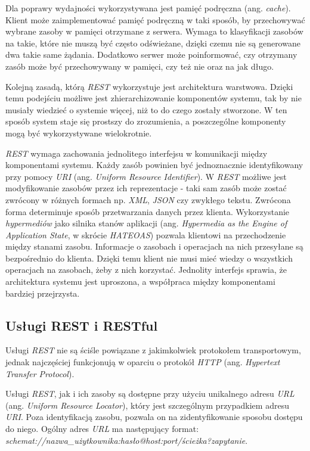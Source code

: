 Dla poprawy wydajności wykorzystywana  jest pamięć podręczna (ang. \textsl{cache}). Klient może zaimplementować pamięć podręczną w taki sposób, by przechowywać wybrane zasoby w pamięci otrzymane z serwera. Wymaga to klasyfikacji zasobów na takie, które nie muszą być często odświeżane, dzięki czemu nie są generowane dwa takie same żądania. Dodatkowo serwer może poinformować, czy otrzymany zasób może być przechowywany w pamięci, czy też nie oraz na jak długo. 

Kolejną zasadą, którą \textsl{REST} wykorzystuje jest architektura warstwowa. Dzięki temu podejściu możliwe jest zhierarchizowanie komponentów systemu, tak by nie  musiały wiedzieć o systemie więcej, niż to do czego zostały stworzone. W ten sposób system staje się prostszy do zrozumienia, a poszczególne komponenty mogą być wykorzystywane wielokrotnie.


\textsl{REST} wymaga zachowania jednolitego interfejsu w komunikacji między komponentami systemu. Każdy zasób powinien być jednoznacznie identyfikowany przy pomocy \textsl{URI} (ang. \textsl{Uniform Resource Identifier}). W \textsl{REST} możliwe jest modyfikowanie zasobów przez ich reprezentacje - taki sam zasób może zostać zwrócony w różnych formach np. \textsl{XML}, \textsl{JSON} czy zwykłego tekstu. Zwrócona forma determinuje sposób przetwarzania danych przez klienta. Wykorzystanie  \textsl{hypermediów} jako silnika stanów aplikacji (ang. \textsl{Hypermedia as the Engine of Application State}, w skrócie \textsl{HATEOAS}) pozwala klientowi na przechodzenie między stanami zasobu. Informacje o  zasobach i operacjach na nich przesyłane są bezpośrednio do klienta. Dzięki temu klient nie musi mieć wiedzy o wszystkich operacjach na zasobach, żeby z nich korzystać. Jednolity interfejs sprawia, że architektura systemu jest uproszona, a współpraca między komponentami bardziej przejrzysta.
 
\subsection{Usługi REST i RESTful}
Usługi \textsl{REST} nie są ściśle powiązane z jakimkolwiek protokołem transportowym, jednak najczęściej funkcjonują w oparciu o protokół \textsl{HTTP} (ang. \textsl{Hypertext Transfer Protocol}).

Usługi \textsl{REST}, jak i ich zasoby są dostępne przy użyciu unikalnego adresu \textsl{URL} (ang. \textsl{Uniform Resource Locator}), który jest szczególnym przypadkiem adresu \textsl{URI}. Poza identyfikacją zasobu, pozwala on na zidentyfikowanie sposobu dostępu do niego. Ogólny adres \textsl{URL} ma następujący format: \\ \textsl{schemat://nazwa\_użytkownika:hasło@host:port/ścieżka?zapytanie}. 


